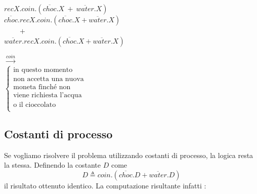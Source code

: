 		\begin{minipage}{0.55\linewidth}
			\begin{flushleft}
				\vspace{-4 mm}
				$recX.coin.(\overline{choc}.X\ + \ \overline{water}.X)$\\
				\vspace{20 mm}
				$\overline{choc}.recX.coin.(\overline{choc}.X + \overline{water}.X)$\\
				$\qquad +$\\
				$\overline{water}.recX.coin.(\overline{choc}.X + \overline{water}.X)$\\
			\end{flushleft}
		\end{minipage}
		\begin{minipage}{0.4\linewidth}
			\begin{flushright}
				\vspace{7 mm}
				$\xrightarrow{coin}$\\
				\vspace{9 mm}
				$\begin{cases}
					\text{in questo momento }\\
					\text{non accetta una nuova}\\
					\text{moneta finch\'e non}\\
					\text{viene richiesta l'acqua}\\
					\text{o il cioccolato}\\
				\end{cases}$\\
			\end{flushright}
		\end{minipage}
		
		\subsection{Costanti di processo}
		
		\qquad Se vogliamo risolvere il problema utilizzando costanti di processo, la logica resta la stessa. Definendo la costante $D$ come
		$$D \triangleq coin.(\overline{choc}.D + \overline{water}.D)$$ il risultato ottenuto \eacc identico. La computazione risultante infatti \eacc:
		
